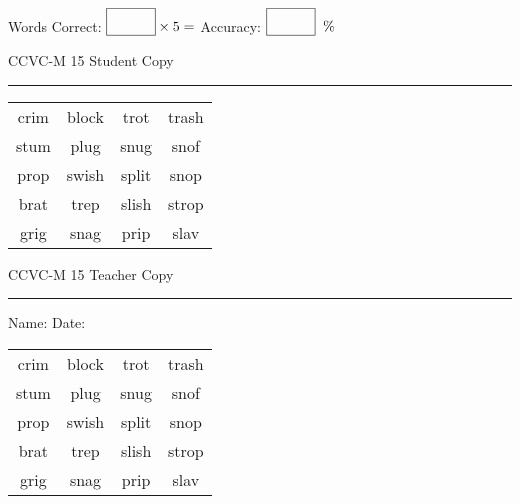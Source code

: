 \documentclass{memoir}
\begin{document}
\small

Words Correct: $\fbox{\phantom{\huge 100}} \times 5 = $ Accuracy: $\fbox{\phantom{\huge 100}}\;\; \%$ 

\vfill

\newpage


\footnotesize \noindent
CCVC-M 15 \hfill Student Copy
\smallskip
\hrule

\Large

\setlength{\tabcolsep}{14pt}
\def\arraystretch{3}

{\selectfont


\begin{vplace}[0.5]
\begin{center}
\begin{tabular}{cccc}
crim & block & trot & trash \\
stum & plug & snug & snof \\
prop & swish & split & snop \\
brat               & trep & slish & strop \\
grig      & snag & prip & slav \\
\end{tabular}
\end{center}
\end{vplace}

}

\newpage

\footnotesize \noindent
CCVC-M 15 \hfill Teacher Copy
\smallskip
\hrule

\small

\vfill

\noindent
Name: \underline{\hspace{1.75in}} \hfill Date: \underline{\hspace{1in}}

\Large

{\selectfont


\begin{vplace}[0.5]
\begin{center}
\begin{tabular}{cccc}
crim & block & trot & trash \\
stum & plug & snug & snof \\
prop & swish & split & snop \\
brat               & trep & slish & strop \\
grig      & snag & prip & slav \\
\end{tabular}
\end{center}
\end{vplace}



}
\end{document}
